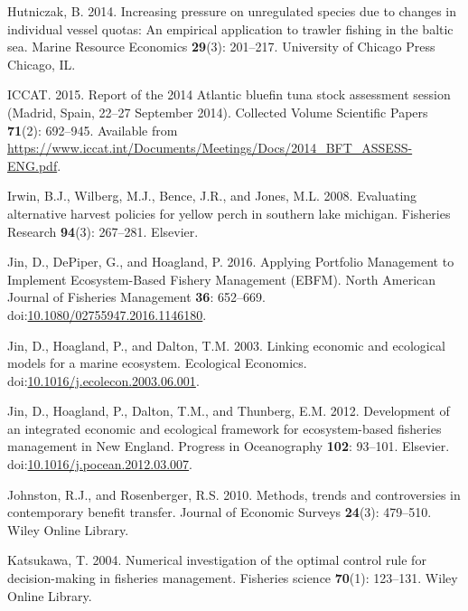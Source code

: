 \documentclass[]{article}
\begin{document}
\hypertarget{ref-hutniczak2014increasing}{}
Hutniczak, B. 2014. Increasing pressure on unregulated species due to
changes in individual vessel quotas: An empirical application to trawler
fishing in the baltic sea. Marine Resource Economics \textbf{29}(3):
201--217. University of Chicago Press Chicago, IL.

\hypertarget{ref-iccat_report_2015}{}
ICCAT. 2015. Report of the 2014 Atlantic bluefin tuna stock assessment
session (Madrid, Spain, 22--27 September 2014). Collected Volume
Scientific Papers \textbf{71}(2): 692--945. Available from
\url{https://www.iccat.int/Documents/Meetings/Docs/2014_BFT_ASSESS-ENG.pdf}.

\hypertarget{ref-irwin2008evaluating}{}
Irwin, B.J., Wilberg, M.J., Bence, J.R., and Jones, M.L. 2008.
Evaluating alternative harvest policies for yellow perch in southern
lake michigan. Fisheries Research \textbf{94}(3): 267--281. Elsevier.

\hypertarget{ref-Jin2016ApplyingEBFM}{}
Jin, D., DePiper, G., and Hoagland, P. 2016. Applying Portfolio
Management to Implement Ecosystem-Based Fishery Management (EBFM). North
American Journal of Fisheries Management \textbf{36}: 652--669.
doi:\href{https://doi.org/10.1080/02755947.2016.1146180}{10.1080/02755947.2016.1146180}.

\hypertarget{ref-Jin2003LinkingEcosystem}{}
Jin, D., Hoagland, P., and Dalton, T.M. 2003. Linking economic and
ecological models for a marine ecosystem. Ecological Economics.
doi:\href{https://doi.org/10.1016/j.ecolecon.2003.06.001}{10.1016/j.ecolecon.2003.06.001}.

\hypertarget{ref-Jin2012DevelopmentEngland}{}
Jin, D., Hoagland, P., Dalton, T.M., and Thunberg, E.M. 2012.
Development of an integrated economic and ecological framework for
ecosystem-based fisheries management in New England. Progress in
Oceanography \textbf{102}: 93--101. Elsevier.
doi:\href{https://doi.org/10.1016/j.pocean.2012.03.007}{10.1016/j.pocean.2012.03.007}.

\hypertarget{ref-johnston2010methods}{}
Johnston, R.J., and Rosenberger, R.S. 2010. Methods, trends and
controversies in contemporary benefit transfer. Journal of Economic
Surveys \textbf{24}(3): 479--510. Wiley Online Library.

\hypertarget{ref-katsukawa2004numerical}{}
Katsukawa, T. 2004. Numerical investigation of the optimal control rule
for decision-making in fisheries management. Fisheries science
\textbf{70}(1): 123--131. Wiley Online Library.
\end{document}
